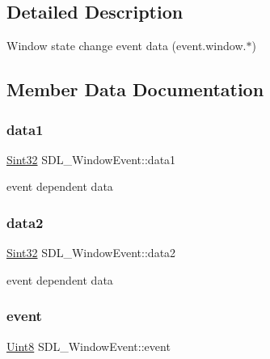 \subsection{Detailed Description}
Window state change event data (event.\+window.$\ast$) 

\subsection{Member Data Documentation}
\mbox{\label{struct_s_d_l___window_event_a01da0025428d3434c80021f3e4089fec}} 
\subsubsection{\texorpdfstring{data1}{data1}}
{\footnotesize\ttfamily \hyperlink{_s_d_l__stdinc_8h_a7a90b941db9d4582e9ad7abb9940ff7e}{Sint32} S\+D\+L\+\_\+\+Window\+Event\+::data1}

event dependent data \mbox{\label{struct_s_d_l___window_event_af6cd0a21bc9ecadfee42f6a0147d7171}} 
\subsubsection{\texorpdfstring{data2}{data2}}
{\footnotesize\ttfamily \hyperlink{_s_d_l__stdinc_8h_a7a90b941db9d4582e9ad7abb9940ff7e}{Sint32} S\+D\+L\+\_\+\+Window\+Event\+::data2}

event dependent data \mbox{\label{struct_s_d_l___window_event_a485cd1f07f0f22fdb9f4c4bf214011dc}} 
\subsubsection{\texorpdfstring{event}{event}}
{\footnotesize\ttfamily \hyperlink{_s_d_l__stdinc_8h_a2944638813a090aa23e62f4da842c3e2}{Uint8} S\+D\+L\+\_\+\+Window\+Event\+::event}

